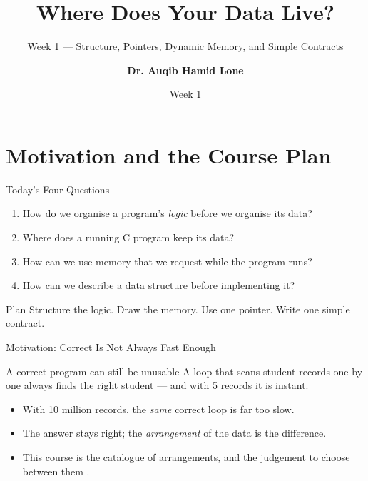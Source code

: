 \documentclass[aspectratio=169]{beamer}
\title{Where Does Your Data Live?}
\subtitle{Week 1 --- Structure, Pointers, Dynamic Memory, and Simple Contracts}
\author[Dr. Auqib Hamid Lone]{\textbf{Dr. Auqib Hamid Lone}}
\institute[GCET Ganderbal]{PCC CS-301: Data Structures\\GCET, Ganderbal}
\date[Week 1]{\small Week 1}
\begin{document}
\frame{\titlepage}

\section{Motivation and the Course Plan}

\begin{frame}{Today's Four Questions}
  \begin{enumerate}
    \item How do we organise a program's \emph{logic} before we organise its data?
    \item Where does a running C program keep its data?
    \item How can we use memory that we request while the program runs?
    \item How can we describe a data structure before implementing it?
  \end{enumerate}
  \vspace{0.2cm}
  \begin{exampleblock}{Plan}
    Structure the logic. Draw the memory. Use one pointer. Write one simple
    contract.
  \end{exampleblock}
\end{frame}

\begin{frame}{Motivation: Correct Is Not Always Fast Enough}
  \begin{block}{A correct program can still be unusable}
    A loop that scans student records one by one always finds the right
    student --- and with 5 records it is instant.
  \end{block}
  \begin{itemize}
    \item With 10 million records, the \emph{same} correct loop is far too slow.
    \item The answer stays right; the \emph{arrangement} of the data is the
      difference.
    \item This course is the catalogue of arrangements, and the judgement to
      choose between them
      \cite{HorowitzSahni2008_fundamentals_data_structures,AhoHopcroftUllman1983_data_structures_algorithms}.
  \end{itemize}
\end{frame}
\end{document}
